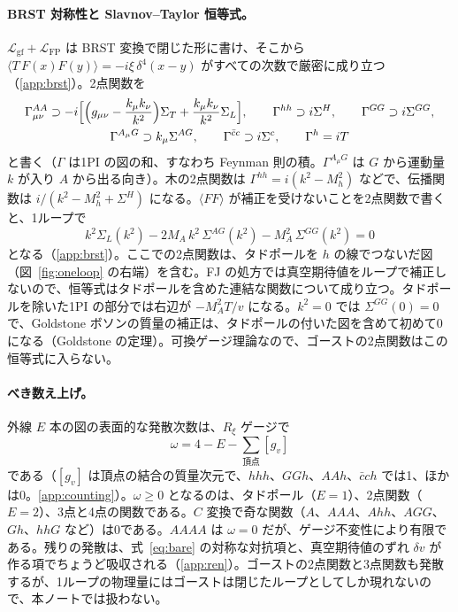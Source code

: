 \documentclass[a4paper,10pt]{ltjsarticle}
\begin{document}
\paragraph{BRST 対称性と Slavnov--Taylor 恒等式。}$\mathcal L_{\mathrm{gf}}+\mathcal L_{\mathrm{FP}}$ は BRST 変換で閉じた形に書け、そこから $\langle T\,F(x)F(y)\rangle=-i\xi\,\delta^4(x-y)$ がすべての次数で厳密に成り立つ（\ref{app:brst}）。2点関数を
\begin{equation}
\begin{gathered}
\Gamma^{AA}_{\mu\nu}\supset-i\Bigl[\Bigl(g_{\mu\nu}-\frac{k_\mu k_\nu}{k^2}\Bigr)\Sigma_T+\frac{k_\mu k_\nu}{k^2}\Sigma_L\Bigr],\qquad
\Gamma^{hh}\supset i\Sigma^H,\qquad \Gamma^{GG}\supset i\Sigma^{GG},\\
\Gamma^{A_\mu G}\supset k_\mu\Sigma^{AG},\qquad \Gamma^{\bar cc}\supset i\Sigma^c,\qquad \Gamma^h=iT
\end{gathered}
\label{eq:Gamma2}
\end{equation}
と書く（$\Gamma$ は1PI の図の和、すなわち Feynman 則の積。$\Gamma^{A_\mu G}$ は $G$ から運動量 $k$ が入り $A$ から出る向き）。木の2点関数は $\Gamma^{hh}=i(k^2-M_h^2)$ などで、伝播関数は $i/(k^2-M_h^2+\Sigma^H)$ になる。$\langle FF\rangle$ が補正を受けないことを2点関数で書くと、1ループで
\begin{equation}
k^2\Sigma_L(k^2)-2M_A\,k^2\,\Sigma^{AG}(k^2)-M_A^2\,\Sigma^{GG}(k^2)=0
\label{eq:stid}
\end{equation}
となる（\ref{app:brst}）。ここでの2点関数は、タドポールを $h$ の線でつないだ図（図~\ref{fig:oneloop} の右端）を含む。FJ の処方では真空期待値をループで補正しないので、恒等式はタドポールを含めた連結な関数について成り立つ。タドポールを除いた1PI の部分では右辺が $-M_A^2T/v$ になる。$k^2=0$ では $\Sigma^{GG}(0)=0$ で、Goldstone ボソンの質量の補正は、タドポールの付いた図を含めて初めて0になる（Goldstone の定理）。可換ゲージ理論なので、ゴーストの2点関数はこの恒等式に入らない。

\paragraph{べき数え上げ。}外線 $E$ 本の図の表面的な発散次数は、$R_\xi$ ゲージで
\begin{equation}
\omega=4-E-\sum_{\text{頂点}}[g_v]
\label{eq:omega}
\end{equation}
である（$[g_v]$ は頂点の結合の質量次元で、$hhh$、$GGh$、$AAh$、$\bar cch$ では1、ほかは0。\ref{app:counting}）。$\omega\ge0$ となるのは、タドポール（$E=1$）、2点関数（$E=2$）、3点と4点の関数である。$C$ 変換で奇な関数（$A$、$AAA$、$Ahh$、$AGG$、$Gh$、$hhG$ など）は0である。$AAAA$ は $\omega=0$ だが、ゲージ不変性により有限である。残りの発散は、式~\eqref{eq:bare} の対称な対抗項と、真空期待値のずれ $\delta v$ が作る項でちょうど吸収される（\ref{app:ren}）。ゴーストの2点関数と3点関数も発散するが、1ループの物理量にはゴーストは閉じたループとしてしか現れないので、本ノートでは扱わない。
\end{document}
